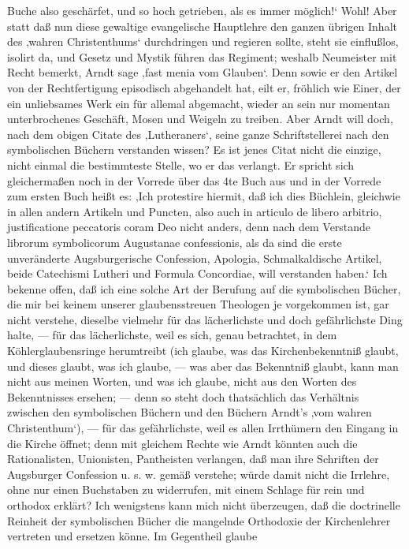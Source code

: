Buche also geschärfet, und so hoch getrieben, als es immer möglich!‘ Wohl! Aber statt daß nun
diese gewaltige evangelische Hauptlehre den ganzen übrigen Inhalt des ‚wahren Christenthums‘
durchdringen und regieren sollte, steht sie einflußlos, isolirt da, und Gesetz und Mystik führen das
Regiment; weshalb Neumeister mit Recht bemerkt, Arndt sage ‚fast menia vom Glauben‘. Denn sowie
er den Artikel von der Rechtfertigung episodisch abgehandelt hat, eilt er, fröhlich wie Einer, der
ein unliebsames Werk ein für allemal abgemacht, wieder an sein nur momentan unterbrochenes Geschäft,
Mosen und Weigeln zu treiben. Aber Arndt will doch, nach dem obigen Citate des ‚Lutheraners‘, seine
ganze Schriftstellerei nach den symbolischen Büchern verstanden wissen? Es ist jenes Citat nicht die
einzige, nicht einmal die bestimmteste Stelle, wo er das verlangt. Er spricht sich gleichermaßen noch
in der Vorrede über das 4te Buch aus und in der Vorrede zum ersten Buch heißt es: ‚Ich protestire
hiermit, daß ich dies Büchlein, gleichwie in allen andern Artikeln und Puncten, also auch in articulo
de libero arbitrio, justificatione peccatoris coram Deo nicht anders, denn nach dem Verstande librorum
symbolicorum Augustanae confessionis, als da sind die erste unveränderte Augsburgerische Confession,
Apologia, Schmalkaldische Artikel, beide Catechismi Lutheri und Formula Concordiae, will verstanden
haben.‘ Ich bekenne offen, daß ich eine solche Art der Berufung auf die symbolischen Bücher, die mir
bei keinem unserer glaubensstreuen Theologen je vorgekommen ist, gar nicht verstehe, dieselbe vielmehr
für das lächerlichste und doch gefährlichste Ding halte, — für das lächerlichste, weil es sich,
genau betrachtet, in dem Köhlerglaubensringe herumtreibt (ich glaube, was das Kirchenbekenntniß
glaubt, und dieses glaubt, was ich glaube, — was aber das Bekenntniß glaubt, kann man nicht aus
meinen Worten, und was ich glaube, nicht aus den Worten des Bekenntnisses ersehen; — denn so steht
doch thatsächlich das Verhältnis zwischen den symbolischen Büchern und den Büchern Arndt’s ‚vom
wahren Christenthum‘), — für das gefährlichste, weil es allen Irrthümern den Eingang in die Kirche
öffnet; denn mit gleichem Rechte wie Arndt könnten auch die Rationalisten, Unionisten, Pantheisten
verlangen, daß man ihre Schriften der Augsburger Confession u. s. w. gemäß verstehe; würde damit
nicht die Irrlehre, ohne nur einen Buchstaben zu widerrufen, mit einem Schlage für rein und orthodox
erklärt? Ich wenigstens kann mich nicht überzeugen, daß die doctrinelle Reinheit der symbolischen
Bücher die mangelnde Orthodoxie der Kirchenlehrer vertreten und ersetzen könne. Im Gegentheil glaube
